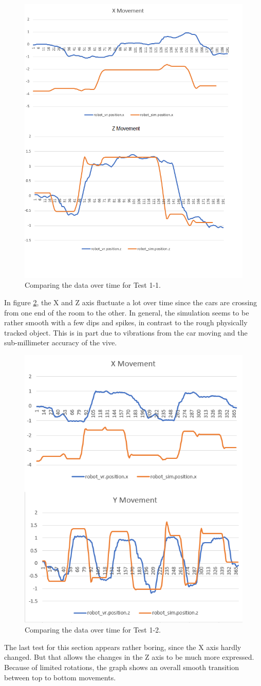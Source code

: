 \documentclass[10pt,a4paper]{article}
\begin{document}
	\begin{figure}
		\centering
		\includegraphics[width=.4\textwidth]{Test1_charts/t1_1_x_z.png}
		\caption{Comparing the data over time for Test 1-1.}
		\label{fig:graph_comp_t1_1}
	\end{figure}
	In figure \ref{fig:graph_comp_t1_2}, the X and Z axis fluctuate a lot over time since the cars are crossing from one end of the room to the other. In general, the simulation seems to be rather smooth with a few dips and spikes, in contrast to the rough physically tracked object. This is in part due to vibrations from the car moving and the sub-millimeter accuracy of the vive.
	\\
	\begin{figure}
		\centering
		\includegraphics[width=.4\textwidth]{Test1_charts/t1_2_x_z.png}
		\caption{Comparing the data over time for Test 1-2.}
		\label{fig:graph_comp_t1_2}
	\end{figure}
	The last test for this section appears rather boring, since the X axis hardly changed. But that allows the changes in the Z axis to be much more expressed. Because of limited rotations, the graph shows an  overall smooth transition between top to bottom movements.
	
\end{document}
